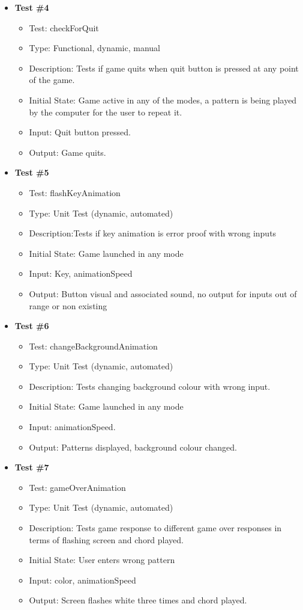 \documentclass[12pt, titlepage]{article}
\begin{document}
\begin{itemize}
\item \textbf{Test \#4}
\begin{itemize}
\item Test: checkForQuit
\item Type: Functional, dynamic, manual		
\item Description: Tests if game quits when quit button is pressed at any point of the game.	
\item Initial State: Game active in any of the modes, a pattern is being played by the computer for the user to repeat it.
\item Input: Quit button pressed.
\item Output: Game quits.	
\end{itemize}

\item \textbf{Test \#5}
\begin{itemize}
\item Test: flashKeyAnimation
\item Type: Unit Test (dynamic, automated)			
\item Description:Tests if key animation is error proof with wrong inputs
\item Initial State: Game launched in any mode
\item Input: Key, animationSpeed
\item Output: Button visual and associated sound, no output for inputs out of range or non existing		
\end{itemize}

\item \textbf{Test \#6}
\begin{itemize}
\item Test: changeBackgroundAnimation
\item Type: Unit Test (dynamic, automated)			
\item Description: Tests changing background colour with wrong input.	
\item Initial State: Game launched in any mode
\item Input: animationSpeed.
\item Output: Patterns displayed, background colour changed.	
\end{itemize}

\item \textbf{Test \#7}
\begin{itemize}
\item Test: gameOverAnimation
\item Type: Unit Test (dynamic, automated)			
\item Description: Tests game response to different game over responses in terms of flashing screen and chord played.	
\item Initial State: User enters wrong pattern
\item Input: color, animationSpeed
\item Output: Screen flashes white three times and chord played.		
\end{itemize}


\end{itemize}
\end{document}
